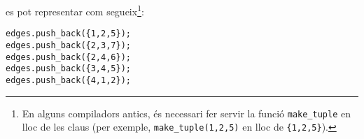 \begin{samepage}
es pot representar com segueix\footnote{En alguns compiladors
antics, és necessari fer servir la funció \texttt{make\_tuple} en lloc de
les claus (per exemple, \texttt{make\_tuple(1,2,5)} en lloc de
\texttt{\{1,2,5\}}).}:  
\begin{lstlisting}
edges.push_back({1,2,5});
edges.push_back({2,3,7});
edges.push_back({2,4,6});
edges.push_back({3,4,5});
edges.push_back({4,1,2});
\end{lstlisting}
\end{samepage}
